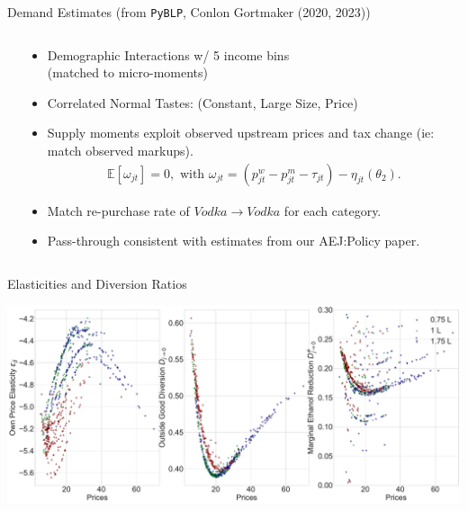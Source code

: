 \documentclass[aspectratio=169,10pt]{beamer}
\begin{document}
\begin{frame}{Demand Estimates (from \texttt{PyBLP}, Conlon Gortmaker (2020, 2023))}
\begin{columns}[T]
 \hspace{-1.5cm}
 \begin{column}{.68\textwidth}
\vspace{-0.3cm}
    \begin{center}
    \scalebox{0.55}{
    
    }
    \end{center}
  \end{column}
  \hfill
 \hspace{-2.2cm}
\begin{column}{.55\textwidth}
  \begin{itemize}
    \item Demographic Interactions w/ 5 income bins \\ (matched to micro-moments)
    \item Correlated Normal Tastes: (Constant, Large Size, Price)
    \item Supply moments exploit observed upstream prices and tax change (ie: match observed markups).
    \vspace{-0.2cm}
    \begin{align*}
    \mathbb{E}[\omega_{jt}]=0, \text{ with }\omega_{jt} = \left(p^w_{jt}  - p^m_{jt}-\tau_{jt} \right) -\eta_{jt}\left(\theta_2\right).
    \end{align*}
   \vspace{-0.8cm}
   \item Match re-purchase rate of $Vodka \rightarrow Vodka$ for each category.
    \item Pass-through consistent with estimates from our AEJ:Policy paper.
  \end{itemize}
\end{column}
\end{columns}
\end{frame}

\begin{frame}{Elasticities and Diversion Ratios}
\begin{center}
    \includegraphics[height=0.8\textheight]{./resources/figure6_outside_diversion_elas.pdf}
\end{center}
\end{frame}
\end{document}
